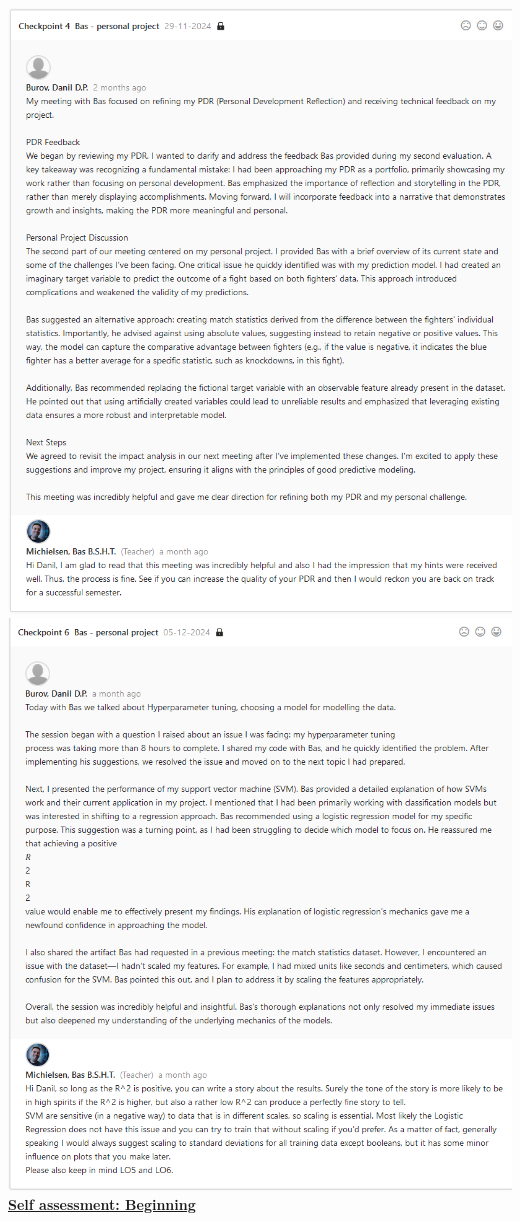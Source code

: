 \documentclass{article}
\begin{document}
\includegraphics[width=\textwidth,keepaspectratio]{images/Feedback_Bas_1.png}\\
\includegraphics[width=\textwidth,keepaspectratio]{images/Feedback_Bas_2.png}\\
  \underline{\textbf{Self assessment: Beginning}}
\end{document}

